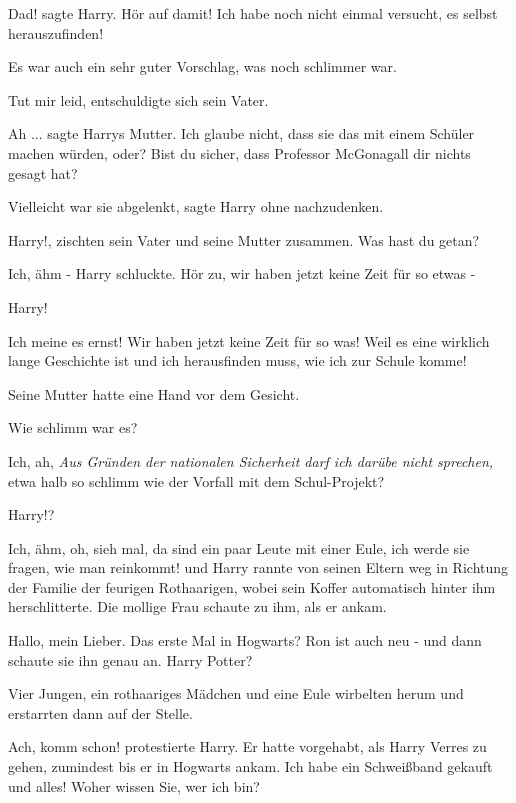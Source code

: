 \glqq Dad!\grqq{} sagte Harry. \glqq Hör auf damit! Ich habe noch nicht einmal
versucht, es selbst herauszufinden!\grqq{}

Es war auch ein sehr guter Vorschlag, was noch schlimmer war.

\glqq Tut mir leid\grqq{}, entschuldigte sich sein Vater.

\glqq Ah ...\grqq{} sagte Harrys Mutter. \glqq Ich glaube nicht, dass sie das
mit einem Schüler machen würden, oder? Bist du sicher, dass Professor McGonagall
dir nichts gesagt hat?\grqq{}

\glqq Vielleicht war sie abgelenkt\grqq{}, sagte Harry ohne nachzudenken.

\glqq Harry!\grqq{}, zischten sein Vater und seine Mutter zusammen. \glqq Was
hast du getan?\grqq{}

\glqq Ich, ähm -\grqq{} Harry schluckte. \glqq Hör zu, wir haben jetzt keine
Zeit für so etwas -\grqq{}

\glqq Harry!\grqq{}

\glqq Ich meine es ernst! Wir haben jetzt keine Zeit für so was! Weil es eine
wirklich lange Geschichte ist und ich herausfinden muss, wie ich zur Schule
komme!\grqq{}

Seine Mutter hatte eine Hand vor dem Gesicht.

\glqq Wie schlimm war es?\grqq{}

\glqq Ich, ah\grqq{}, \emph{Aus Gründen der nationalen Sicherheit darf ich
darübe nicht sprechen,} \glqq etwa halb so schlimm wie der Vorfall mit dem
Schul-Projekt?\grqq{}

\glqq Harry!?\grqq{}

\glqq Ich, ähm, oh, sieh mal, da sind ein paar Leute mit einer Eule, ich werde
sie fragen, wie man reinkommt!\grqq{} und Harry rannte von seinen Eltern weg in
Richtung der Familie der feurigen Rothaarigen, wobei sein Koffer automatisch
hinter ihm herschlitterte. Die mollige Frau schaute zu ihm, als er ankam.

\glqq Hallo, mein Lieber. Das erste Mal in Hogwarts? Ron ist auch neu -\grqq{}
und dann schaute sie ihn genau an. \glqq Harry Potter?\grqq{}

Vier Jungen, ein rothaariges Mädchen und eine Eule wirbelten herum und
erstarrten dann auf der Stelle.

\glqq Ach, komm schon!\grqq{} protestierte Harry. Er hatte vorgehabt, als Harry
Verres zu gehen, zumindest bis er in Hogwarts ankam. \glqq Ich habe ein
Schweißband gekauft und alles! Woher wissen Sie, wer ich bin?\grqq{}

